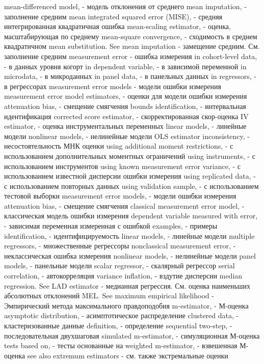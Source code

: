 mean-differenced model, - модель отклонения от среднего
mean imputation, - заполнение средним
mean integrated squared error (MISE), - средняя интегрированная квадратичная ошибка
mean-scaling estimator, - оценка, масштабирующая по среднему
mean-square convergence, - сходимость в среднем квадратичном
mean substitution. See mean imputation - замещение средним. См. заполнение средним
measurement error - ошибка измерения
in cohort-level data, - в данных уровня когорт
in dependent variable, - в зависимой переменной
in microdata, - в микроданных
in panel data, - в панельных данных
in regressors, - в регрессорах
measurement error models - модели ошибки измерения
measurement error model estimators, - оценки для модели ошибки измерения
attenuation bias, - смещение смягчения
bounds identification, - интервальная идентификация
corrected score estimator, - скорректированная скор-оценка
IV estimator, - оценка инструментальных переменных
linear models, - линейные модели
nonlinear models, - нелинейные модели
OLS estimator inconsistency, - несостоятельность МНК оценки
using additional moment restrictions, - с использованием дополнительных моментных ограничений
using instruments, - с использованием инструментов
using known measurement error variance, - с использованием известной дисперсии ошибки измерения
using replicated data, - с использованием повторных данных
using validation sample, - с использованием тестовой выборки
measurement error models, - модели ошибки измерения
attenuation bias, - смещение смягчения
classical measurement error model, - классическая модель ошибки измерения
dependent variable measured with error, - зависимая переменная измеренная с ошибкой
examples, - примеры
identification, - идентифицируемость
linear models, - линейные модели
multiple regressors, - множественные регрессоры
nonclassical measurement error, - неклассическая ошибка измерения
nonlinear models, - нелинейные модели
panel models, - панельные модели
scalar regressor, - скалярный регрессор
serial correlation, - автокорреляция
variance inflation, - вздутие дисперсии
median regression. See LAD estimator - медианная регрессия. См. оценка наименьших абсолютных отклонений
MEL. See maximum empirical likelihood - Эмпирический метода максимального правдоподобия
m-estimator, - М-оценка
asymptotic distribution, - асимптотическое распределение
clustered data, - кластеризованные данные
definition, - определение
sequential two-step, - последовательная двухшаговая
simulated m-estimator, - симуляционная М-оценка
tests based on, - тесты основанные на
weighted m-estimator, - взвешенная М-оценка
see also extremum estimators - см. также экстремальные оценки

